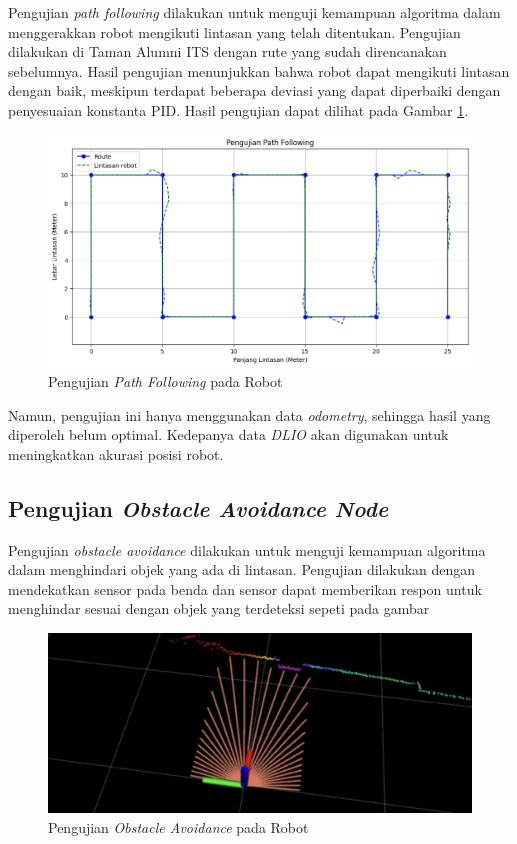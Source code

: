 Pengujian \emph{path following} dilakukan untuk menguji kemampuan algoritma dalam menggerakkan robot mengikuti lintasan yang telah ditentukan. Pengujian dilakukan di Taman Alumni ITS dengan rute yang sudah direncanakan sebelumnya. Hasil pengujian menunjukkan bahwa robot dapat mengikuti lintasan dengan baik, meskipun terdapat beberapa deviasi yang dapat diperbaiki dengan penyesuaian konstanta PID. Hasil pengujian dapat dilihat pada Gambar \ref{fig:Path Following pada Robot}.
\begin{figure}[H] \centering \includegraphics[scale=0.6]{gambar/path_following_test.png} \caption{Pengujian \emph{Path Following} pada Robot} \label{fig:Path Following pada Robot} \end{figure}

Namun, pengujian ini hanya menggunakan data \emph{odometry}, sehingga hasil yang diperoleh belum optimal. Kedepanya data \emph{DLIO} akan digunakan untuk meningkatkan akurasi posisi robot.

\subsection{Pengujian \emph{Obstacle Avoidance Node}}
Pengujian \emph{obstacle avoidance} dilakukan untuk menguji kemampuan algoritma dalam menghindari objek yang ada di lintasan. Pengujian dilakukan dengan mendekatkan sensor pada benda dan sensor dapat memberikan respon untuk menghindar sesuai dengan objek yang terdeteksi sepeti pada gambar 
\begin{figure}[H] \centering 
    \includegraphics[scale=0.35]{gambar/obstacle_avoidance.png}
    \caption{Pengujian \emph{Obstacle Avoidance} pada Robot}
    \label{fig:Obstacle Avoidance pada Robot}
\end{figure}

